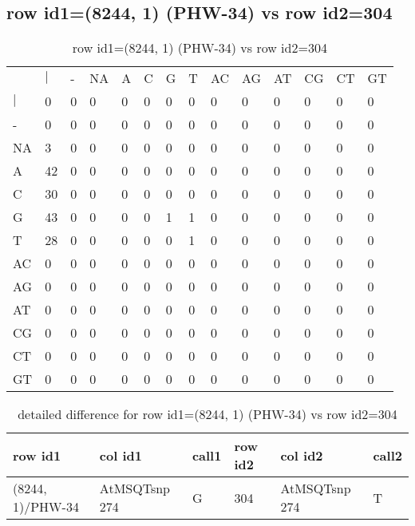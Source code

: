 \subsection{row id1=(8244, 1) (PHW-34) vs row id2=304}
\begin{center}
\begin{longtable}{|l|l|l|l|l|l|l|l|l|l|l|l|l|l|}
\caption{row id1=(8244, 1) (PHW-34) vs row id2=304} \label{table_dm374}\\
\hline
\\
\hline
&$|$&-&NA&A&C&G&T&AC&AG&AT&CG&CT&GT\\
$|$&0&0&0&0&0&0&0&0&0&0&0&0&0\\
-&0&0&0&0&0&0&0&0&0&0&0&0&0\\
NA&3&0&0&0&0&0&0&0&0&0&0&0&0\\
A&42&0&0&0&0&0&0&0&0&0&0&0&0\\
C&30&0&0&0&0&0&0&0&0&0&0&0&0\\
G&43&0&0&0&0&1&1&0&0&0&0&0&0\\
T&28&0&0&0&0&0&1&0&0&0&0&0&0\\
AC&0&0&0&0&0&0&0&0&0&0&0&0&0\\
AG&0&0&0&0&0&0&0&0&0&0&0&0&0\\
AT&0&0&0&0&0&0&0&0&0&0&0&0&0\\
CG&0&0&0&0&0&0&0&0&0&0&0&0&0\\
CT&0&0&0&0&0&0&0&0&0&0&0&0&0\\
GT&0&0&0&0&0&0&0&0&0&0&0&0&0\\
\hline
\end{longtable}
\end{center}

\begin{center}
\begin{longtable}{|l|l|l|l|l|l|}
\caption{detailed difference for row id1=(8244, 1) (PHW-34) vs row id2=304} \label{table_dm375}\\
\hline
row id1&col id1&call1&row id2&col id2&call2\\
\hline
(8244, 1)/PHW-34&AtMSQTsnp 274&G&304&AtMSQTsnp 274&T\\
\hline
\end{longtable}
\end{center}

